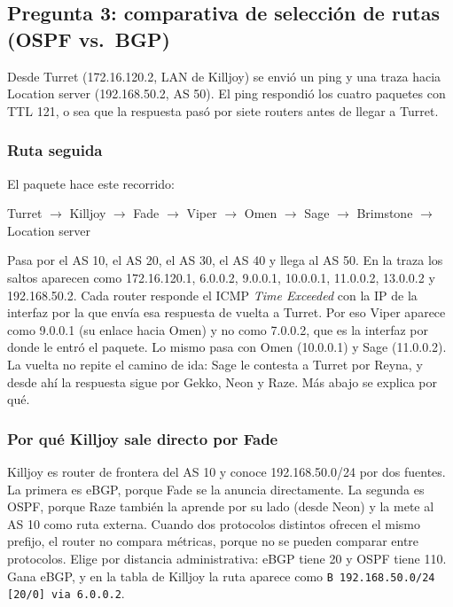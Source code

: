 \subsection{Pregunta 3: comparativa de selección de rutas (OSPF vs.\ BGP)}

Desde Turret (172.16.120.2, LAN de Killjoy) se envió un ping y una traza hacia Location server (192.168.50.2, AS 50). El ping respondió los cuatro paquetes con TTL 121, o sea que la respuesta pasó por siete routers antes de llegar a Turret.


\subsubsection*{Ruta seguida}

El paquete hace este recorrido:

\begin{center}
Turret $\rightarrow$ Killjoy $\rightarrow$ Fade $\rightarrow$ Viper $\rightarrow$ Omen $\rightarrow$ Sage $\rightarrow$ Brimstone $\rightarrow$ Location server
\end{center}

Pasa por el AS 10, el AS 20, el AS 30, el AS 40 y llega al AS 50. En la traza los saltos aparecen como 172.16.120.1, 6.0.0.2, 9.0.0.1, 10.0.0.1, 11.0.0.2, 13.0.0.2 y 192.168.50.2. Cada router responde el ICMP \textit{Time Exceeded} con la IP de la interfaz por la que envía esa respuesta de vuelta a Turret. Por eso Viper aparece como 9.0.0.1 (su enlace hacia Omen) y no como 7.0.0.2, que es la interfaz por donde le entró el paquete. Lo mismo pasa con Omen (10.0.0.1) y Sage (11.0.0.2). La vuelta no repite el camino de ida: Sage le contesta a Turret por Reyna, y desde ahí la respuesta sigue por Gekko, Neon y Raze. Más abajo se explica por qué.

\subsubsection*{Por qué Killjoy sale directo por Fade}

Killjoy es router de frontera del AS 10 y conoce 192.168.50.0/24 por dos fuentes. La primera es eBGP, porque Fade se la anuncia directamente. La segunda es OSPF, porque Raze también la aprende por su lado (desde Neon) y la mete al AS 10 como ruta externa. Cuando dos protocolos distintos ofrecen el mismo prefijo, el router no compara métricas, porque no se pueden comparar entre protocolos. Elige por distancia administrativa: eBGP tiene 20 y OSPF tiene 110. Gana eBGP, y en la tabla de Killjoy la ruta aparece como \texttt{B 192.168.50.0/24 [20/0] via 6.0.0.2}.

